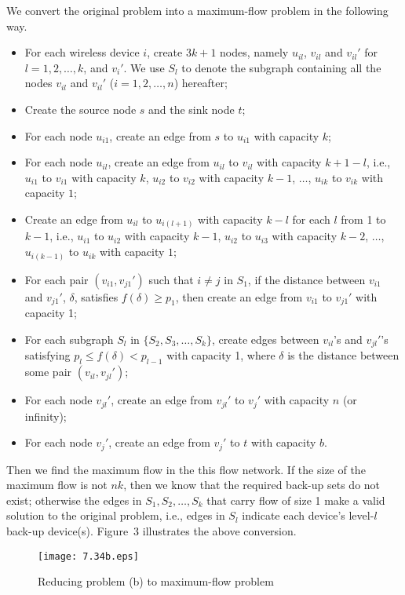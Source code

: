 \documentclass[12pt,letterpaper]{article}
\begin{document}
We convert the original problem into a maximum-flow problem in the following way.
\begin{itemize}
\item For each wireless device $i$, create $3k+1$ nodes, namely $u_{il}$, $v_{il}$ and $v_{il}'$  for $l = 1, 2, \dots, k$, and $v_i'$. We use $S_l$ to denote the subgraph containing all the nodes $v_{il}$ and $v_{il}'$ ($i = 1, 2, \dots, n$) hereafter;
\item Create the source node $s$ and the sink node $t$;
\item For each node $u_{i1}$, create an edge from $s$ to $u_{i1}$ with capacity $k$;
\item For each node $u_{il}$, create an edge from $u_{il}$ to $v_{il}$ with capacity $k+1-l$, i.e., $u_{i1}$ to $v_{i1}$ with capacity $k$, $u_{i2}$ to $v_{i2}$ with capacity $k-1$, $\dots$, $u_{ik}$ to $v_{ik}$ with capacity $1$;
\item Create an edge from $u_{il}$ to $u_{i(l+1)}$ with capacity $k-l$ for each $l$ from 1 to $k-1$, i.e., $u_{i1}$ to $u_{i2}$ with capacity $k-1$, $u_{i2}$ to $u_{i3}$ with capacity $k-2$, $\dots$, $u_{i(k-1)}$ to $u_{ik}$ with capacity $1$;
\item For each pair $(v_{i1}, v_{j1}')$ such that $i\ne j$ in $S_1$, if the distance between $v_{i1}$ and $v_{j1}'$, $\delta$, satisfies $f(\delta)\ge p_1$, then create an edge from $v_{i1}$ to $v_{j1}'$ with capacity 1;
\item For each subgraph $S_l$ in $\{S_2, S_3, \dots, S_k\}$, create edges between $v_{il}$'s and $v_{jl}'$'s satisfying $p_l\le f(\delta)<p_{l-1}$ with capacity 1, where $\delta$ is the distance between some pair $(v_{il}, v_{jl}')$;
\item For each node $v_{jl}'$, create an edge from $v_{jl}'$ to $v_j'$ with capacity $n$ (or infinity);
\item For each node $v_j'$, create an edge from $v_j'$ to $t$ with capacity $b$.
\end{itemize}

Then we find the maximum flow in the this flow network. If the size of the maximum flow is not $nk$, then we know that the required back-up sets do not exist; otherwise the edges in $S_1, S_2, \dots, S_k$ that carry flow of size 1 make a valid solution to the original problem, i.e., edges in $S_l$ indicate each device's level-$l$ back-up device(s). Figure~3 illustrates the above conversion.

\begin{figure}
\begin{center}
\texttt{[image: 7.34b.eps]}
\caption{Reducing problem (b) to maximum-flow problem}
\end{center}
\end{figure}
\end{document}

